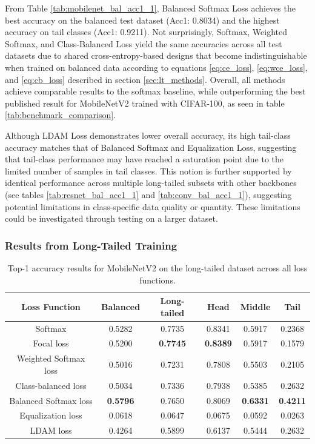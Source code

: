 From Table \ref{tab:mobilenet_bal_acc1_1}, Balanced Softmax Loss achieves the best accuracy on the balanced test dataset (Acc1: 0.8034) and the highest accuracy on tail classes (Acc1: 0.9211). Not surprisingly, Softmax, Weighted Softmax, and Class-Balanced Loss yield the same accuracies across all test datasets due to shared cross-entropy-based designs that become indistinguishable when trained on balanced data according to equations \eqref{eq:ce_loss}, \eqref{eq:wce_loss}, and \eqref{eq:cb_loss} described in section \ref{sec:lt_methods}. Overall, all methods achieve comparable results to the softmax baseline, while outperforming the best published result for MobileNetV2 trained with CIFAR-100, as seen in table \ref{tab:benchmark_comparison}.

Although LDAM Loss demonstrates lower overall accuracy, its high tail-class accuracy matches that of Balanced Softmax and Equalization Loss, suggesting that tail-class performance may have reached a saturation point due to the limited number of samples in tail classes. This notion is further supported by identical performance across multiple long-tailed subsets with other backbones (see tables \ref{tab:resnet_bal_acc1_1} and \ref{tab:conv_bal_acc1_1}), suggesting potential limitations in class-specific data quality or quantity. These limitations could be investigated through testing on a larger dataset. 

\subsubsection{Results from Long-Tailed Training}

\begin{table}[H]
    \centering
    \caption{Top-1 accuracy results for MobileNetV2 on the long-tailed dataset across all loss functions.}
    \begin{tabular}{cccccc}
        \toprule
        Loss Function & Balanced & Long-tailed & Head & Middle & Tail \\ 
        \midrule
        Softmax   & 0.5282   & 0.7735 & 0.8341 & 0.5917 & 0.2368 \\
        Focal loss   & 0.5200   & \textbf{0.7745} & \textbf{0.8389} & 0.5917 & 0.1579 \\
        Weighted Softmax loss   & 0.5016   & 0.7231 & 0.7808 & 0.5503 & 0.2105 \\
        Class-balanced loss   &  0.5034  & 0.7336 & 0.7938 & 0.5385 & 0.2632 \\
        Balanced Softmax loss   & \textbf{0.5796}   & 0.7650 & 0.8069 & \textbf{0.6331} & \textbf{0.4211} \\
        Equalization loss   &   0.0618 & 0.0647 & 0.0675 & 0.0592 & 0.0263 \\
        LDAM loss   & 0.4264 & 0.5899 & 0.6137 & 0.5444 & 0.2632 \\
        \bottomrule
    \end{tabular}
    \label{tab:mobilenet_lt_acc1_1}
\end{table}

